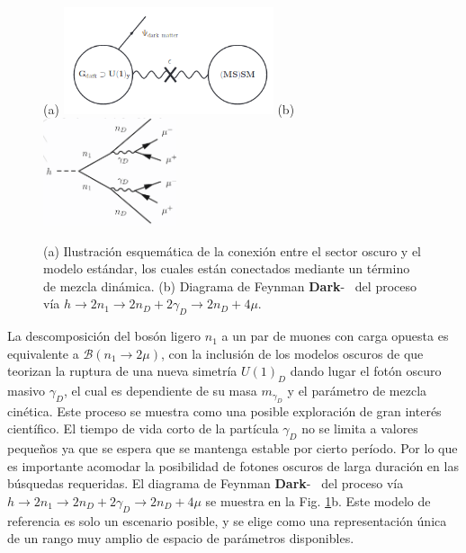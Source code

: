\begin{figure}[!t]
    \centering
    (a)
    \includegraphics[width=0.55\textwidth]{Fisica_de_Particulas/imagenes/sketch_darksector.png}
    (b)
    \includegraphics[width=0.35\textwidth]{Fisica_de_Particulas/imagenes/darksusy_feynman.png}
    \caption{(a) Ilustración esquemática de la conexión entre el sector oscuro y el modelo estándar, los cuales están conectados mediante un término de mezcla dinámica. (b) Diagrama de Feynman \textbf{Dark}-\SUSY ~ del proceso vía $h \rightarrow 2n_1 \rightarrow 2n_D + 2\gamma_D \rightarrow 2n_D + 4\mu$.}
    \label{fig:sketch_darksector}
\end{figure}

La descomposición del bosón ligero $n_1$ a un par de muones con carga opuesta es equivalente a $\mathcal{B}(n_1 \rightarrow 2\mu)$, con la inclusión de los modelos oscuros de \SUSY que teorizan la ruptura de una nueva simetría $U(1)_D$ dando lugar el fotón oscuro masivo $\gamma_D$, el cual es dependiente de su masa $m_{\gamma_D}$ y el parámetro de mezcla cinética. Este proceso se muestra como una posible exploración de gran interés científico. El tiempo de vida corto de la partícula $\gamma_D$ no se limita a valores pequeños ya que se espera que se mantenga estable por cierto período. Por lo que es importante acomodar la posibilidad de fotones oscuros de larga duración en las búsquedas requeridas. El diagrama de Feynman \textbf{Dark}-\SUSY ~ del proceso vía $h \rightarrow 2n_1 \rightarrow 2n_D + 2\gamma_D \rightarrow 2n_D + 4\mu$ se muestra en la Fig. \ref{fig:sketch_darksector}b. Este modelo de referencia es solo un escenario posible, y se elige como una representación única de un rango muy amplio de espacio de parámetros disponibles. %


















